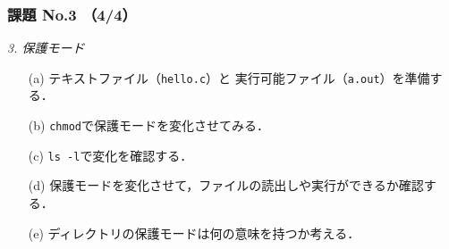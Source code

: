 \documentclass{beamer}                 %
\begin{document}
\begin{frame}[fragile]
  \frametitle{課題 No.3 （4/4）}
  \emph{3. 保護モード}
\begin{enumerate}
\item[(a)] テキストファイル（\texttt{hello.c}）と
実行可能ファイル（\texttt{a.out}）を準備する．
\item[(b)] \texttt{chmod}で保護モードを変化させてみる．
\item[(c)] \texttt{ls -l}で変化を確認する．
\item[(d)] 保護モードを変化させて，ファイルの読出しや実行ができるか確認する．
\item[(e)] ディレクトリの保護モードは何の意味を持つか考える．
\end{enumerate}
\end{frame}
\end{document}
